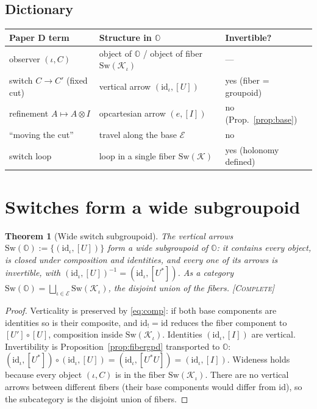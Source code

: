 \documentclass[11pt]{article}
\newtheorem{theorem}{Theorem}
\theoremstyle{definition}
\theoremstyle{remark}
\newcommand{\K}{\mathcal K}
\newcommand{\Ecat}{\mathcal E}
\newcommand{\Oc}{\mathbb O}
\newcommand{\Sw}{\mathrm{Sw}}
\newcommand{\id}{\mathrm{id}}
\newcommand{\pushf}[1]{{#1}_{!}}
\newcommand{\STC}{{\normalfont\textsc{[Complete]}}}
\begin{document}
\subsection*{Dictionary}
\begin{center}\small
\begin{tabular}{lll}
\toprule
Paper D term & Structure in $\Oc$ & Invertible?\\
\midrule
observer $(\iota,C)$ & object of $\Oc$ / object of fiber $\Sw(\K_\iota)$ & ---\\
switch $C\to C'$ (fixed cut) & vertical arrow $(\id_\iota,[U])$ & yes (fiber = groupoid)\\
refinement $A\mapsto A\otimes I$ & opcartesian arrow $(e,[I])$ & no (Prop.~\ref{prop:base})\\
``moving the cut'' & travel along the base $\Ecat$ & no\\
switch loop & loop in a single fiber $\Sw(\K)$ & yes (holonomy defined)\\
\bottomrule
\end{tabular}
\end{center}

\section{Switches form a wide subgroupoid}\label{sec:subgpd}

\begin{theorem}[Wide switch subgroupoid]\label{thm:subgpd}
The vertical arrows $\Sw(\Oc):=\{(\id_\iota,[U])\}$ form a wide subgroupoid of $\Oc$:
it contains every object, is closed under composition and identities, and every one of
its arrows is invertible, with $(\id_\iota,[U])^{-1}=(\id_\iota,[U^\ast])$. As a
category $\Sw(\Oc)=\bigsqcup_{\iota\in\Ecat}\Sw(\K_\iota)$, the disjoint union of the
fibers. \STC
\end{theorem}
\begin{proof}
Verticality is preserved by \eqref{eq:comp}: if both base components are identities so
is their composite, and $\pushf{\id}=\id$ reduces the fiber component to $[U']\circ[U]$,
composition inside $\Sw(\K_\iota)$. Identities $(\id_\iota,[I])$ are vertical.
Invertibility is Proposition~\ref{prop:fibergpd} transported to $\Oc$:
$(\id_\iota,[U^\ast])\circ(\id_\iota,[U])=(\id_\iota,[U^\ast U])=(\id_\iota,[I])$.
Wideness holds because every object $(\iota,C)$ is in the fiber $\Sw(\K_\iota)$. There
are no vertical arrows between different fibers (their base components would differ from
$\id$), so the subcategory is the disjoint union of fibers. \end{proof}
\end{document}
